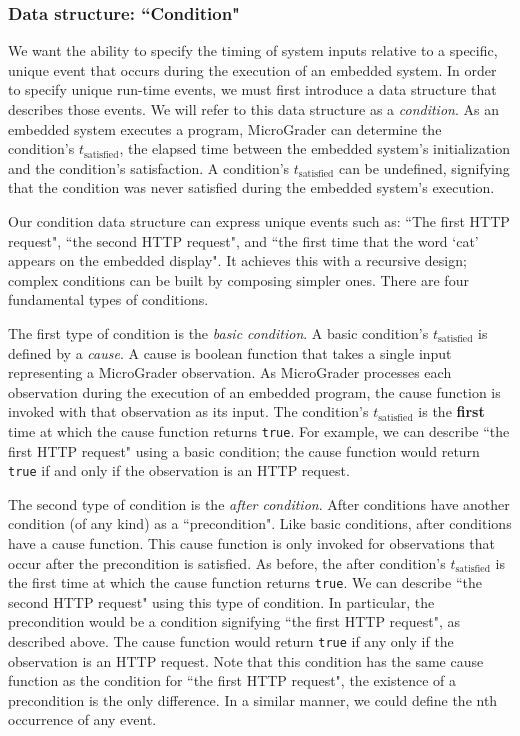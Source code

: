 \documentclass[12pt]{article}
\begin{document}
\subsubsection{Data structure: ``Condition"}
\label{sec:condition}
We want the ability to specify the timing of system inputs relative to a specific, unique event that occurs during the execution of an embedded system.  In order to specify unique run-time events, we must first introduce a data structure that describes those events.  We will refer to this data structure as a \textit{condition}.  As an embedded system executes a program, MicroGrader can determine the condition's $t_{\text{satisfied}}$, the elapsed time between the embedded system's initialization and the condition's satisfaction.  A condition's $t_{\text{satisfied}}$ can be undefined, signifying that the condition was never satisfied during the embedded system's execution.

Our condition data structure can express unique events such as: ``The first HTTP request", ``the second HTTP request", and ``the first time that the word `cat' appears on the embedded display".  It achieves this with a recursive design; complex conditions can be built by composing simpler ones.  There are four fundamental types of conditions.

The first type of condition is the \textit{basic condition}.  A basic condition's $t_{\text{satisfied}}$ is defined by a \textit{cause}. A cause is boolean function that takes a single input representing a MicroGrader observation.  As MicroGrader processes each observation during the execution of an embedded program, the cause function is invoked with that observation as its input.  The condition's $t_{\text{satisfied}}$ is the \textbf{first} time at which the cause function returns \texttt{true}.  For example, we can describe ``the first HTTP request" using a basic condition; the cause function would return \texttt{true} if and only if the observation is an HTTP request.

The second type of condition is the \textit{after condition}.  After conditions have another condition (of any kind) as a ``precondition".  Like basic conditions, after conditions have a cause function.  This cause function is only invoked for observations that occur after the precondition is satisfied.  As before, the after condition's $t_{\text{satisfied}}$ is the first time at which the cause function returns \texttt{true}.  We can describe ``the second HTTP request" using this type of condition.  In particular, the precondition would be a condition signifying ``the first HTTP request", as described above.  The cause function would return \texttt{true} if any only if the observation is an HTTP request.  Note that this condition has the same cause function as the condition for ``the first HTTP request", the existence of a precondition is the only difference.  In a similar manner, we could define the nth occurrence of any event.
\end{document}
